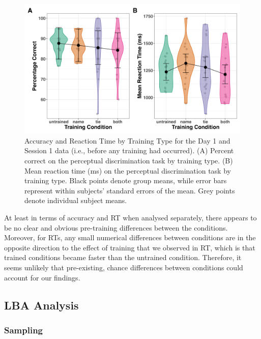 \documentclass[
  man,floatsintext]{apa6}
\begin{document}
\begin{figure}[H]

{\centering \includegraphics[height=0.67\textheight,]{../../figures/descriptive/day1_session1_violin_acc_rt} 

}

\caption{Accuracy and Reaction Time by Training Type for the Day 1 and Session 1 data (i.e., before any training had occurred). (A) Percent correct on the perceptual discrimination task by training type. (B) Mean reaction time (ms) on the perceptual discrimination task by training type. Black points denote group means, while error bars represent within subjects' standard errors of the mean. Grey points denote individual subject means.}\label{fig:day1-plot}
\end{figure}

At least in terms of accuracy and RT when analysed separately, there appears to be no clear and obvious pre-training differences between the conditions. Moreover, for RTs, any small numerical differences between conditions are in the opposite direction to the effect of training that we observed in RT, which is that trained conditions became faster than the untrained condition. Therefore, it seems unlikely that pre-existing, chance differences between conditions could account for our findings.

\subsection{LBA Analysis}\label{lba-analysis}

\subsubsection{Sampling}\label{sampling}
\end{document}

